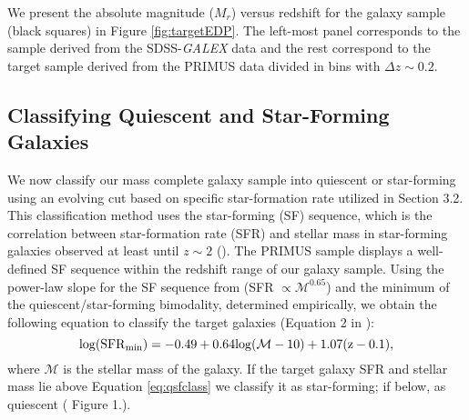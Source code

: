 \documentclass{emulateapj}
\begin{document}
We present the absolute magnitude ($M_{r}$) versus redshift for the galaxy sample (black squares) in Figure \ref{fig:targetEDP}. The left-most panel corresponds to the sample derived from the SDSS-{\em GALEX} data and the rest correspond to the target sample derived from the PRIMUS data divided in bins with $\Delta z \sim 0.2$. 
\subsection{Classifying Quiescent and Star-Forming Galaxies} \label{sec:sfq}
We now classify our mass complete galaxy sample into quiescent or star-forming using an evolving cut based on specific star-formation rate utilized in \cite{Moustakas:2013aa} Section 3.2. This classification method uses the star-forming (SF) sequence, which is the correlation between star-formation rate (SFR) and stellar mass in star-forming galaxies observed at least until $z \sim 2$ (\citealt{Noeske:2007aa}). The PRIMUS sample displays a well-defined SF sequence within the redshift range of our galaxy sample. Using the power-law slope for the SF sequence from \cite{Salim:2007aa} (SFR $\propto \mathcal{M}^{0.65}$) and the minimum of the quiescent/star-forming bimodality, determined empirically, we obtain the following equation to classify the target galaxies (Equation 2 in \citealt{Moustakas:2013aa}):
\begin{equation}
\rm{log}(\rm{SFR}_{\rm{min}}) = -0.49 + 0.64 \rm{log}(\mathcal{M} - 10) +1.07(z-0.1), 
\end{equation} \label{eq:qsfclass} 
where $\mathcal{M}$ is the stellar mass of the galaxy. If the target galaxy SFR and stellar mass lie above Equation \ref{eq:qsfclass} we classify it as star-forming; if below, as quiescent (\citealt{Moustakas:2013aa} Figure 1.).
\end{document}
